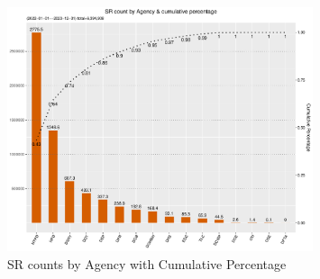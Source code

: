 \documentclass[12pt, titlepage]{article}
\begin{document}
\begin{figure}[tbp]
	\centering
	\includegraphics[width=0.8\textwidth]{SRs_by_Agency.pdf}
  	\caption{SR counts by Agency with Cumulative Percentage}
	\label{fig:SRcountbyAgency}
\end{figure}

\end{document}
